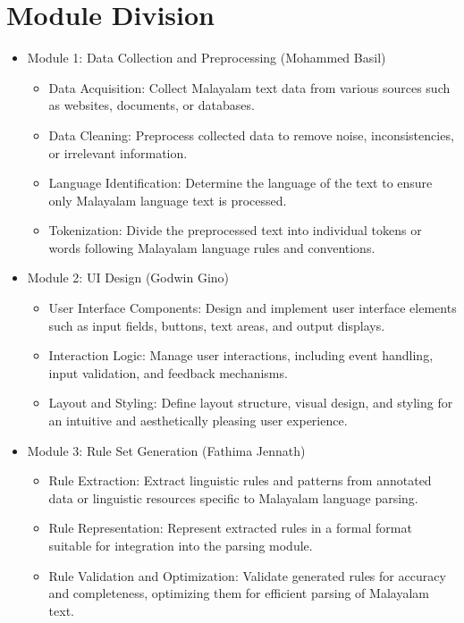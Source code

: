 \documentclass[12pt,a4paper,titlepage]{report}
\begin{document}
	\section{Module Division}
	\begin{itemize}
		\item Module 1: Data Collection and Preprocessing (Mohammed Basil)
		\begin{itemize}
			\item Data Acquisition: Collect Malayalam text data from various sources such as websites, documents, or databases.
			\item Data Cleaning: Preprocess collected data to remove noise, inconsistencies, or irrelevant information.
			\item Language Identification: Determine the language of the text to ensure only Malayalam language text is processed.
			\item Tokenization: Divide the preprocessed text into individual tokens or words following Malayalam language rules and conventions.
		\end{itemize}
		\item Module 2: UI Design (Godwin Gino)
		\begin{itemize}
			\item User Interface Components: Design and implement user interface elements such as input fields, buttons, text areas, and output displays.
			\item Interaction Logic: Manage user interactions, including event handling, input validation, and feedback mechanisms.
			\item Layout and Styling: Define layout structure, visual design, and styling for an intuitive and aesthetically pleasing user experience.
		\end{itemize}
		\item Module 3: Rule Set Generation (Fathima Jennath)
		\begin{itemize}
			\item Rule Extraction: Extract linguistic rules and patterns from annotated data or linguistic resources specific to Malayalam language parsing.
			\item Rule Representation: Represent extracted rules in a formal format suitable for integration into the parsing module.
			\item Rule Validation and Optimization: Validate generated rules for accuracy and completeness, optimizing them for efficient parsing of Malayalam text.
		\end{itemize}

\end{itemize}
\end{document}
